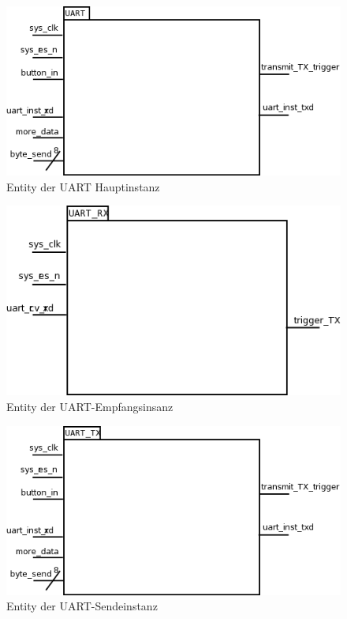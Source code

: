 \begin{figure}[!ht]
	\centering
	\includegraphics[scale=0.3]{figures/uart.png} 
	\caption{Entity der UART Hauptinstanz}
	\label{fig:entity_rs232}
\end{figure}

\begin{figure}[!ht]
	\centering
	\includegraphics[scale=0.3]{figures/uart_rx.png} 
	\caption{Entity der UART-Empfangsinsanz}
	\label{fig:entity_rs232_rx}
\end{figure}

\begin{figure}[!ht]
	\centering
	\includegraphics[scale=0.3]{figures/uart_tx.png} 
	\caption{Entity der UART-Sendeinstanz}
	\label{fig:entity_rs232_tx}
\end{figure}

